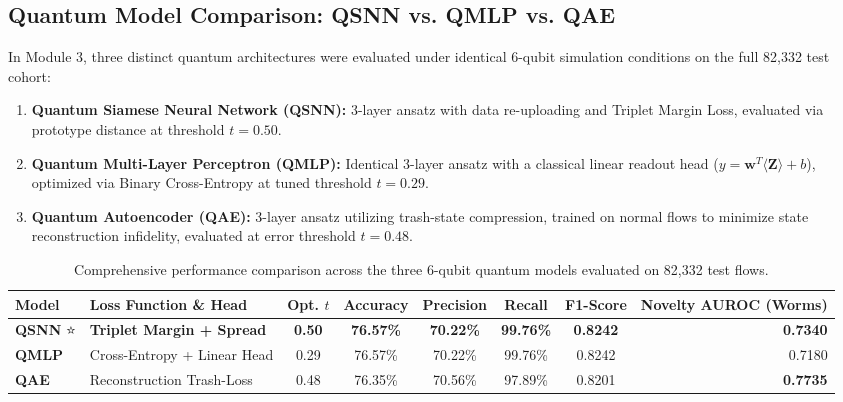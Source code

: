 \documentclass[preprint,12pt]{elsarticle}
\begin{document}
\subsection{Quantum Model Comparison: QSNN vs. QMLP vs. QAE}
In Module 3, three distinct quantum architectures were evaluated under identical 6-qubit simulation conditions on the full 82,332 test cohort:
\begin{enumerate}
    \item \textbf{Quantum Siamese Neural Network (QSNN):} 3-layer ansatz with data re-uploading and Triplet Margin Loss, evaluated via prototype distance at threshold $t = 0.50$.
    \item \textbf{Quantum Multi-Layer Perceptron (QMLP):} Identical 3-layer ansatz with a classical linear readout head ($y = \mathbf{w}^T \langle \mathbf{Z} \rangle + b$), optimized via Binary Cross-Entropy at tuned threshold $t = 0.29$.
    \item \textbf{Quantum Autoencoder (QAE):} 3-layer ansatz utilizing trash-state compression, trained on normal flows to minimize state reconstruction infidelity, evaluated at error threshold $t = 0.48$.
\end{enumerate}

\begin{table}[t]
\centering
\caption{Comprehensive performance comparison across the three 6-qubit quantum models evaluated on 82,332 test flows.}
\label{tab:quantum_comparison}
\small
\begin{tabular}{llcccccr}
\toprule
\textbf{Model} & \textbf{Loss Function \& Head} & \textbf{Opt. $t$} & \textbf{Accuracy} & \textbf{Precision} & \textbf{Recall} & \textbf{F1-Score} & \textbf{Novelty AUROC (Worms)} \\
\midrule
\textbf{QSNN} ⭐ & \textbf{Triplet Margin + Spread} & \textbf{0.50} & \textbf{76.57\%} & \textbf{70.22\%} & \textbf{99.76\%} & \textbf{0.8242} & \textbf{0.7340} \\
\textbf{QMLP}    & Cross-Entropy + Linear Head      & 0.29          & 76.57\%          & 70.22\%          & 99.76\%          & 0.8242          & 0.7180 \\
\textbf{QAE}     & Reconstruction Trash-Loss        & 0.48          & 76.35\%          & 70.56\%          & 97.89\%          & 0.8201          & \textbf{0.7735} \\
\bottomrule
\end{tabular}
\end{table}
\end{document}
